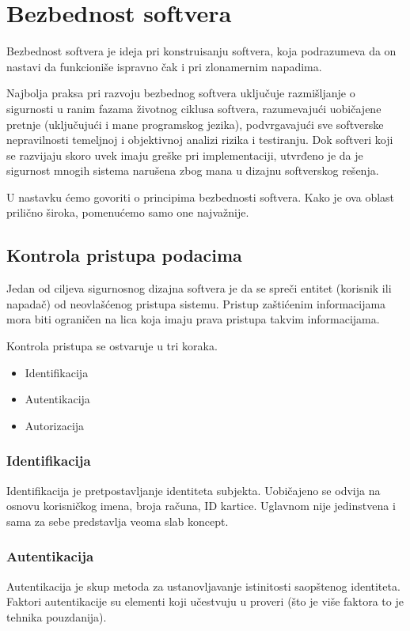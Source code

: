 \documentclass[a4paper]{article}
\begin{document}
\section{Bezbednost softvera} \label{bezbednost}

Bezbednost softvera je ideja pri konstruisanju softvera, koja podrazumeva da on nastavi da funkcioniše ispravno čak i pri zlonamernim napadima.

Najbolja praksa pri razvoju bezbednog softvera uključuje razmišljanje o sigurnosti u ranim fazama životnog ciklusa softvera, razumevajući uobičajene pretnje (uključujući i mane programskog jezika), podvrgavajući sve softverske nepravilnosti temeljnoj i objektivnoj analizi rizika i testiranju. Dok softveri koji se razvijaju skoro uvek imaju greške pri implementaciji, utvrđeno je da je sigurnost mnogih sistema narušena zbog mana u dizajnu softverskog rešenja.

U nastavku ćemo govoriti o principima bezbednosti softvera. Kako je ova oblast prilično široka, pomenućemo samo one najvažnije.

\subsection{Kontrola pristupa podacima}
Jedan od ciljeva sigurnosnog dizajna softvera je da se spreči entitet (korisnik ili napadač) od neovlašćenog pristupa sistemu. Pristup zaštićenim informacijama mora biti ograničen na lica koja imaju prava pristupa takvim informacijama.\cite{BIS}

Kontrola pristupa se ostvaruje u tri koraka.
\begin{itemize}
	\item Identifikacija
	\item Autentikacija
	\item Autorizacija
\end{itemize} 

\subsubsection{Identifikacija}
Identifikacija je pretpostavljanje identiteta subjekta. Uobičajeno se odvija na osnovu korisničkog imena, broja računa, ID kartice. Uglavnom nije jedinstvena i sama za sebe predstavlja veoma slab koncept.

\subsubsection{Autentikacija}
Autentikacija je skup metoda za ustanovljavanje istinitosti saopštenog identiteta. Faktori autentikacije su elementi koji učestvuju u proveri (što je više faktora to je tehnika pouzdanija).
\end{document}
